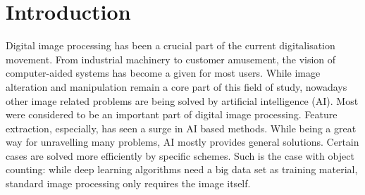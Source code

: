 \documentclass{article}
\begin{document}


\newpage
\tableofcontents
{}


\newpage
\listoffigures

\newpage
\section{Introduction}
Digital image processing has been a crucial part of the current digitalisation movement. From industrial machinery to customer amusement, the vision of computer-aided systems has become a given for most users. While image alteration and manipulation remain a core part of this field of study, nowadays other image related problems are being solved by artificial intelligence (AI). Most were considered to be an important part of digital image processing. Feature extraction, especially, has seen a surge in AI based methods. While being a great way for unravelling many problems, AI mostly provides general solutions. Certain cases are solved more efficiently by specific schemes. Such is the case with object counting: while deep learning algorithms need a big data set as training material, standard image processing only requires the image itself.\\
\end{document}
